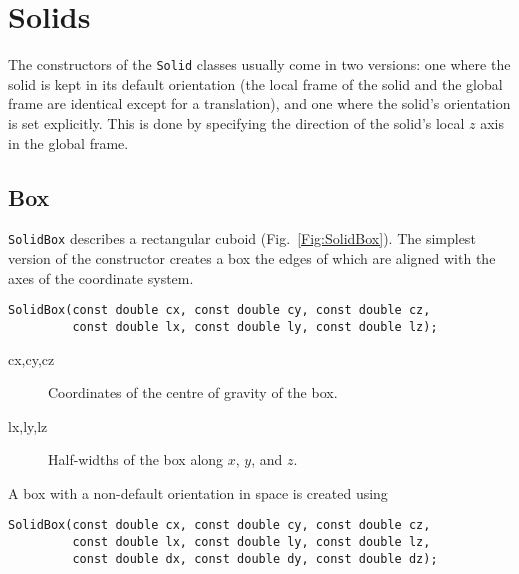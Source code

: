 \chapter{Solids}\label{Sec:Solids}
The constructors of the \texttt{Solid} classes usually come in two versions:
one where the solid is kept in its default orientation 
(\ie the local frame of the solid and the global frame are identical 
except for a translation), and one where the solid's orientation is set 
explicitly. This is done by specifying the direction of the solid's local 
$z$ axis in the global frame.
\section{Box}
\texttt{SolidBox} describes a rectangular cuboid (Fig.~\ref{Fig:SolidBox}).
The simplest version of the constructor creates a box the edges of which 
are aligned with the axes of the coordinate system. 
\begin{lstlisting}
SolidBox(const double cx, const double cy, const double cz, 
         const double lx, const double ly, const double lz);
\end{lstlisting}
\begin{description}
\item[cx,cy,cz] Coordinates of the centre of gravity of the box.
\item[lx,ly,lz] Half-widths of the box along $x$, $y$, and $z$.
\end{description}
A box with a non-default orientation in space is created using
\begin{lstlisting}
SolidBox(const double cx, const double cy, const double cz, 
         const double lx, const double ly, const double lz, 
         const double dx, const double dy, const double dz);
\end{lstlisting} 

